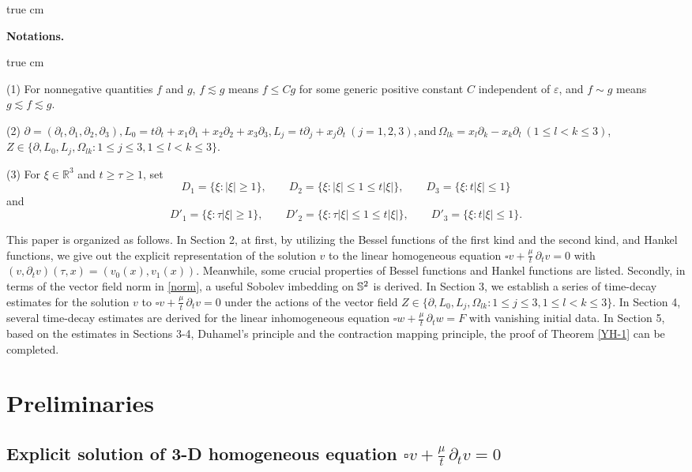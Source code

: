 \documentclass[11pt,twoside]{article}
\newcommand{\p}{\partial}
\newcommand{\ve}{\varepsilon}
\newcommand{\f}{\frac}
\theoremstyle{plain}
\theoremstyle{definition}
\theoremstyle{remark}
\numberwithin{equation}{section}
\begin{document}
 true cm

\noindent\textbf{Notations.}

 true cm

(1) For nonnegative quantities \(f\) and \(g\), \(f\lesssim g\) means \(f\le Cg\) for some generic positive constant \(C\) independent of $\ve$,
 and \(f\sim g\) means \(g\lesssim f\lesssim g\).

(2)
$
\partial=(\partial_t,\partial_1,\partial_2,\partial_3),
L_0=t\partial_t+x_1\partial_1+x_2\partial_2+x_3\partial_3,
L_j=t\partial_j+x_j\partial_t~(j=1,2,3), \text{and}\,
\Omega_{lk}=x_l\partial_k-x_k\partial_l~ (1\leq l<k\leq3)$,
$Z\in\{\partial, L_0, L_j, \Omega_{lk}: 1\le j\le 3, 1\leq l<k\leq3\}$.


(3) For \(\xi\in\mathbb R^3\) and \(t\ge\tau\ge1\), set
\[
D_1=\{\xi: |\xi|\ge1\},\qquad D_2=\{\xi: |\xi|\le1\le t|\xi|\},\qquad D_3=\{\xi: t|\xi|\le1\}
\]
and
\[
D'_1=\{\xi: \tau|\xi|\ge1\},\qquad D'_2=\{\xi: \tau|\xi|\le1\le t|\xi|\},\qquad D'_3=\{\xi: t|\xi|\le1\}.
\]

This paper is organized as follows. In Section 2, at first, by utilizing
the Bessel functions of the first kind and the second kind, and Hankel functions,
we give out the explicit representation of the solution $v$ to the linear homogeneous equation $\square v +\f{\mu}{t}\,\p_tv=0$
with $(v,\p_tv)(\tau,x)=(v_0(x), v_1(x))$. Meanwhile, some crucial properties of Bessel functions and Hankel functions
are listed. Secondly, in terms of the vector field norm in \eqref{norm}, a useful Sobolev imbedding on $\Bbb S^2$
is derived.
In Section 3, we establish a series of time-decay estimates for the solution $v$ to $\square v+\f{\mu}{t}\,\p_tv=0$
under the actions of the vector field $Z\in\{\p, L_0, L_j, \Omega_{lk}: 1\le j\le 3, 1\le l<k\le 3\}$.
In Section 4, several time-decay estimates are derived for the linear inhomogeneous
equation $\square w +\f{\mu}{t}\,\p_tw=F$ with vanishing initial data.
In Section 5, based on  the estimates in Sections 3-4,  Duhamel's principle and the contraction mapping principle,
the  proof of Theorem  \ref{YH-1} can be completed.


\section{ Preliminaries}\label{sec2-1}

\subsection{Explicit solution of 3-D homogeneous equation $\square v+\f{\mu}{t}\,\p_tv=0$}\label{sec2-1-1}
\end{document}

